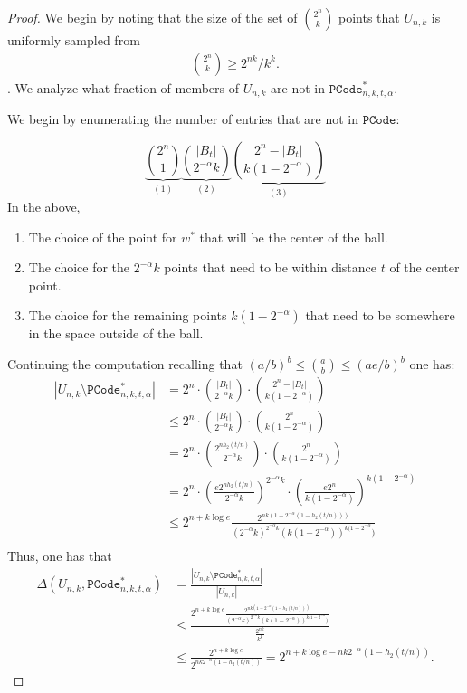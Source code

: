  \begin{proof}
 We begin by noting that the size of the set of ${2^n \choose k}$ points that $U_{n,k}$ is uniformly sampled from
 \begin{align*}
 {2^n\choose k} \ge 2^{nk}/k^k.
 \end{align*}.  We analyze what fraction of members of $U_{n,k}$ are not in $\mathtt{PCode}_{n, k, t, \alpha}^{*}$.
 
 We begin by enumerating the number of entries that are not in $\mathtt{PCode}$:
 
 \[
  \underbrace{{2^n \choose 1}}_{(1)}  \underbrace{{|B_t| \choose 2^{-\alpha}k}}_{(2)}   \underbrace{{2^n-|B_t| \choose k(1-2^{-\alpha})}}_{(3)}
 \]
 In the above, 
 \begin{enumerate}
 \item The choice of the point for $w^*$ that will be the center of the ball.
 \item The choice for the $2^{-\alpha} k$ points that need to be within distance $t$ of the center point.
 \item The choice for the remaining points $k(1-2^{-\alpha})$ that need to be somewhere in the space outside of the ball.
 \end{enumerate}
 Continuing the computation recalling that $(a/b)^b \le {a\choose b} \le (ae/b)^b$ one has:
 \begin{align*}
|U_{n, k} \setminus \mathtt{PCode}_{n, k, t, \alpha}^{*}|  &=2^n \cdot {|B_t| \choose 2^{-\alpha}k}\cdot {2^n-|B_t| \choose k(1-2^{-\alpha})}\\
&\le 2^n \cdot {|B_t| \choose 2^{-\alpha}k}\cdot {2^n \choose k(1-2^{-\alpha})}\\
&= 2^n \cdot {2^{nh_2(t/n)} \choose 2^{-\alpha}k}\cdot {2^n \choose k(1-2^{-\alpha})}\\
&= 2^n \cdot \left(\frac{e2^{nh_2(t/n)}}{2^{-\alpha}k}\right)^{2^{-\alpha}k}\cdot \left(\frac{e2^n}{k(1-2^{-\alpha})}\right)^{k(1-2^{-\alpha})}\\
&\le 2^{n+k\log e} \frac{2^{nk(1-2^{-\alpha}(1-h_2(t/n)))}}{(2^{-\alpha}k)^{2^{-\alpha}k} (k(1-2^{-\alpha}))^{k(1-2^{-\alpha}})}\\
 \end{align*}
 Thus, one has that 
 \begin{align*}
\Delta(U_{n,k}, \mathtt{PCode}_{n, k, t, \alpha}^{*}) &= \frac{|U_{n, k} \setminus \mathtt{PCode}_{n, k, t, \alpha}^{*}|}{|U_{n, k}|}\\
&\le\frac{2^{n+k\log e} \frac{2^{nk(1-2^{-\alpha}(1-h_2(t/n)))}}{(2^{-\alpha}k)^{2^{-\alpha}k} (k(1-2^{-\alpha}))^{k(1-2^{-\alpha}})}}{\frac{2^{nk}}{k^k}}\\
&\le \frac{2^{n+k\log e}}{2^{nk2^{-\alpha}(1-h_2(t/n))}} = 2^{n+k\log e- nk2^{-\alpha}(1-h_2(t/n))}.
 \end{align*}
  \end{proof}